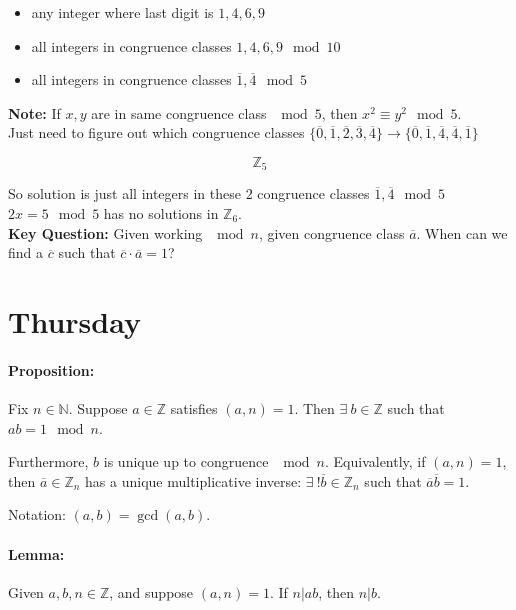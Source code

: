 \documentclass[a4paper, 11pt, twoside]{article}
\begin{document}
\begin{itemize}
	\item any integer where last digit is $1,4,6,9$
	\item all integers in congruence classes $1,4,6,9\mod 10$
	\item all integers in congruence classes $\overline{1}, \overline{4}\mod 5$
\end{itemize}

\textbf{Note:} If $x,y$ are in same congruence class $\mod 5$, then $x^2\equiv y^2\mod 5$.\\

Just need to figure out which congruence classes $\{\overline{0}, \overline{1}, \overline{2}, \overline{3}, \overline{4}\}\rightarrow\{\overline{0},\overline{1}, \overline{4}, \overline{4}, \overline{1}\}$

\[\mathbb{Z}_5\]

So solution is just all integers in these $2$ congruence classes $\overline{1}, \overline{4}\mod 5$\\

$2x=5\mod 5$ has no solutions in $\mathbb{Z}_6$.\\

\textbf{Key Question:} Given working $\mod n$, given congruence class $\overline{a}$. When can we find a $\overline{c}$ such that $\overline{c}\cdot\overline{a}=1$?

\section{Thursday}
\paragraph{Proposition:} Fix $n\in\mathbb{N}$. Suppose $a\in\mathbb{Z}$ satisfies $(a,n)=1$. Then $\exists\ b\in\mathbb{Z}$ such that $ab=1\mod n$.

Furthermore, $b$ is unique up to congruence $\mod n$. Equivalently, if $(a,n)=1$, then $\overline{a}\in\mathbb{Z}_n$ has a unique multiplicative inverse: $\exists\ ! \overline{b}\in\mathbb{Z}_n$ such that $\overline{a}\overline{b}=1$.

Notation: $(a,b)=\gcd(a,b)$.\\

\paragraph{Lemma:} Given $a,b,n\in\mathbb{Z}$, and suppose $(a,n)=1$. If $n|ab$, then $n|b$.
\end{document}
